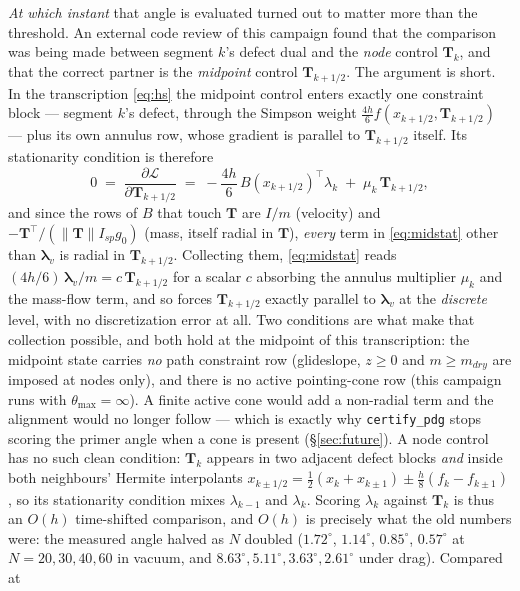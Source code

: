 \documentclass[11pt]{article}
\newcommand{\Tvec}{\mathbf{T}}
\newcommand{\lamv}{\boldsymbol{\lambda}_v}
\begin{document}
\emph{At which instant} that angle is evaluated turned out to matter more
than the threshold. An external code review of this campaign found that the
comparison was being made between segment $k$'s defect dual and the
\emph{node} control $\Tvec_k$, and that the correct partner is the
\emph{midpoint} control $\Tvec_{k+1/2}$. The argument is short. In the
transcription \eqref{eq:hs} the midpoint control enters exactly one
constraint block --- segment $k$'s defect, through the Simpson weight
$\tfrac{4h}{6}f(x_{k+1/2},\Tvec_{k+1/2})$ --- plus its own annulus row,
whose gradient is parallel to $\Tvec_{k+1/2}$ itself. Its stationarity
condition is therefore
%
\begin{equation}
0 \;=\; \frac{\partial \mathcal{L}}{\partial \Tvec_{k+1/2}}
\;=\; -\frac{4h}{6}\,B(x_{k+1/2})^\top \lambda_k
\;+\; \mu_k\, \Tvec_{k+1/2},
\label{eq:midstat}
\end{equation}
%
and since the rows of $B$ that touch $\Tvec$ are $I/m$ (velocity) and
$-\Tvec^\top/(\lVert\Tvec\rVert I_{sp}g_0)$ (mass, itself radial in
$\Tvec$), \emph{every} term in \eqref{eq:midstat} other than $\lamv$ is
radial in $\Tvec_{k+1/2}$. Collecting them,
\eqref{eq:midstat} reads $(4h/6)\,\lamv/m = c\,\Tvec_{k+1/2}$ for a scalar
$c$ absorbing the annulus multiplier $\mu_k$ and the mass-flow term, and so
forces $\Tvec_{k+1/2}$ exactly parallel to $\lamv$ at the \emph{discrete}
level, with no discretization error at all.
Two conditions are what make that collection possible, and both hold at the
midpoint of this transcription: the midpoint state carries \emph{no} path
constraint row (glideslope, $z \ge 0$ and $m \ge m_{dry}$ are imposed at
nodes only), and there is no active pointing-cone row (this campaign runs
with $\theta_{\max} = \infty$). A finite active cone would add a
non-radial term and the alignment would no longer follow --- which is
exactly why \texttt{certify\_pdg} stops scoring the primer angle when a
cone is present (\S\ref{sec:future}).
A node control has no such clean condition: $\Tvec_k$ appears in two
adjacent defect blocks \emph{and} inside both neighbours' Hermite
interpolants $x_{k\pm1/2} = \tfrac12(x_k + x_{k\pm1}) \pm \tfrac{h}{8}(f_k -
f_{k\pm1})$, so its stationarity condition mixes $\lambda_{k-1}$ and
$\lambda_k$. Scoring $\lambda_k$ against $\Tvec_k$ is thus an $O(h)$
time-shifted comparison, and $O(h)$ is precisely what the old numbers were:
the measured angle halved as $N$ doubled ($1.72^\circ$, $1.14^\circ$,
$0.85^\circ$, $0.57^\circ$ at $N = 20, 30, 40, 60$ in vacuum, and
$8.63^\circ, 5.11^\circ, 3.63^\circ, 2.61^\circ$ under drag). Compared at
\end{document}
